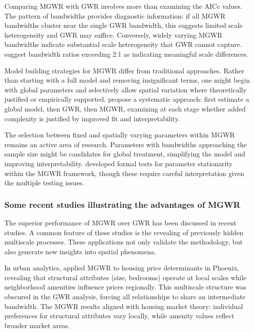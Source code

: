 \documentclass[smallextended, natbib]{svjour3}       %
\begin{document}
Comparing MGWR with GWR involves more than examining the AICc values. 
The pattern of bandwidths provides diagnostic information: if all MGWR bandwidths cluster near the single GWR bandwidth, this suggests limited scale heterogeneity and GWR may suffice. 
Conversely, widely varying MGWR bandwidths indicate substantial scale heterogeneity that GWR cannot capture. \cite{Fotheringham2017} suggest bandwidth ratios exceeding 2:1 as indicating meaningful scale differences.

Model building strategies for MGWR differ from traditional approaches. 
Rather than starting with a full model and removing insignificant terms, one might begin with global parameters and selectively allow spatial variation where theoretically justified or empirically supported. 
\cite{comber2020route} propose a systematic approach: first estimate a global model, then GWR, then MGWR, examining at each stage whether added complexity is justified by improved fit and interpretability.

The selection between fixed and spatially varying parameters within MGWR remains an active area of research. 
Parameters with bandwidths approaching the sample size might be candidates for global treatment, simplifying the model and improving interpretability. 
\cite{mei2006testing} developed formal tests for parameter stationarity within the MGWR framework, though these require careful interpretation given the multiple testing issues.

\subsubsection*{Some recent studies illustrating the advantages of MGWR}

The superior performance of MGWR over GWR has been discussed in recent studies.
A common feature of these studies is the revealing of previously hidden multiscale processes. 
These applications not only validate the methodology, but also generate new insights into spatial phenomena.

In urban analytics, \cite{fotheringham2019examining} applied MGWR to housing price determinants in Phoenix, revealing that structural attributes (size, bedrooms) operate at local scales while neighborhood amenities influence prices regionally. 
This multiscale structure was obscured in the GWR analysis, forcing all relationships to share an intermediate bandwidth.
The MGWR results aligned with housing market theory: individual preferences for structural attributes vary locally, while amenity values reflect broader market areas.
\end{document}
